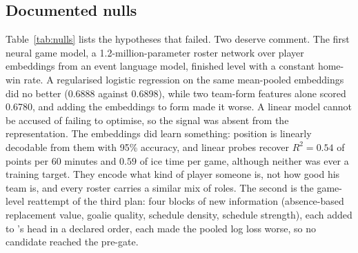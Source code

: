 \subsection{Documented nulls}
\label{sec:res-nulls}

Table~\ref{tab:nulls} lists the hypotheses that failed. Two deserve comment.
The first neural game model, a 1.2-million-parameter roster network over
player embeddings from an event language model, finished level with a constant
home-win rate. A regularised logistic regression on the same mean-pooled
embeddings did no better (0.6888 against 0.6898), while two team-form features
alone scored 0.6780, and adding the embeddings to form made it worse. A linear
model cannot be accused of failing to optimise, so the signal was absent from
the representation. The embeddings did learn something: position is linearly
decodable from them with 95\% accuracy, and linear probes recover
$R^2 = 0.54$ of points per 60 minutes and $0.59$ of ice time per game, although
neither was ever a training target. They encode what kind of player someone is, not how good his
team is, and every roster carries a similar mix of roles. The second is the
game-level reattempt of the third plan: four blocks of new information
(absence-based replacement value, goalie quality, schedule density, schedule
strength), each added to \neurhlH{}'s head in a declared order, each made the pooled
log loss worse, so no candidate reached the pre-gate.

